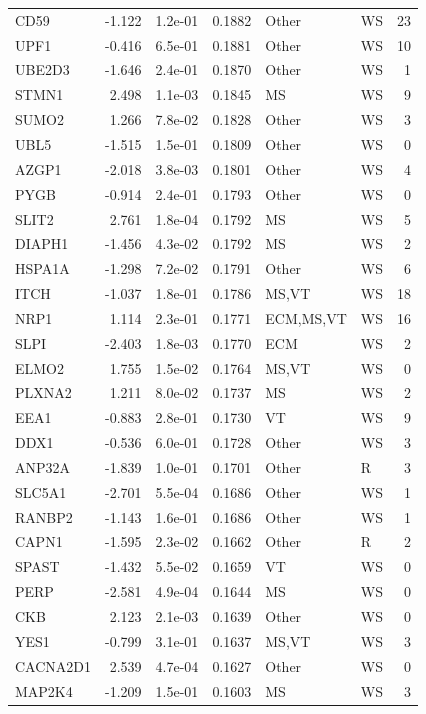 \begin{table}[ht]
\begin{tabular}{lrlrllr}
  CD59 & -1.122 & 1.2e-01 & 0.1882 & Other & WS & 23 \\ 
  UPF1 & -0.416 & 6.5e-01 & 0.1881 & Other & WS & 10 \\ 
  UBE2D3 & -1.646 & 2.4e-01 & 0.1870 & Other & WS & 1 \\ 
  STMN1 & 2.498 & 1.1e-03 & 0.1845 & MS & WS & 9 \\ 
  SUMO2 & 1.266 & 7.8e-02 & 0.1828 & Other & WS & 3 \\ 
  UBL5 & -1.515 & 1.5e-01 & 0.1809 & Other & WS & 0 \\ 
  AZGP1 & -2.018 & 3.8e-03 & 0.1801 & Other & WS & 4 \\ 
  PYGB & -0.914 & 2.4e-01 & 0.1793 & Other & WS & 0 \\ 
  SLIT2 & 2.761 & 1.8e-04 & 0.1792 & MS & WS & 5 \\ 
  DIAPH1 & -1.456 & 4.3e-02 & 0.1792 & MS & WS & 2 \\ 
  HSPA1A & -1.298 & 7.2e-02 & 0.1791 & Other & WS & 6 \\ 
  ITCH & -1.037 & 1.8e-01 & 0.1786 & MS,VT & WS & 18 \\ 
  NRP1 & 1.114 & 2.3e-01 & 0.1771 & ECM,MS,VT & WS & 16 \\ 
  SLPI & -2.403 & 1.8e-03 & 0.1770 & ECM & WS & 2 \\ 
  ELMO2 & 1.755 & 1.5e-02 & 0.1764 & MS,VT & WS & 0 \\ 
  PLXNA2 & 1.211 & 8.0e-02 & 0.1737 & MS & WS & 2 \\ 
  EEA1 & -0.883 & 2.8e-01 & 0.1730 & VT & WS & 9 \\ 
  DDX1 & -0.536 & 6.0e-01 & 0.1728 & Other & WS & 3 \\ 
  ANP32A & -1.839 & 1.0e-01 & 0.1701 & Other & R & 3 \\ 
  SLC5A1 & -2.701 & 5.5e-04 & 0.1686 & Other & WS & 1 \\ 
  RANBP2 & -1.143 & 1.6e-01 & 0.1686 & Other & WS & 1 \\ 
  CAPN1 & -1.595 & 2.3e-02 & 0.1662 & Other & R & 2 \\ 
  SPAST & -1.432 & 5.5e-02 & 0.1659 & VT & WS & 0 \\ 
  PERP & -2.581 & 4.9e-04 & 0.1644 & MS & WS & 0 \\ 
  CKB & 2.123 & 2.1e-03 & 0.1639 & Other & WS & 0 \\ 
  YES1 & -0.799 & 3.1e-01 & 0.1637 & MS,VT & WS & 3 \\ 
  CACNA2D1 & 2.539 & 4.7e-04 & 0.1627 & Other & WS & 0 \\ 
  MAP2K4 & -1.209 & 1.5e-01 & 0.1603 & MS & WS & 3 \\ 

\end{tabular}
\end{table}
